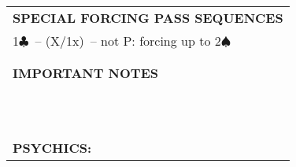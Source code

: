 \documentclass{article}
\newcommand\C{\ensuremath{\clubsuit}}
\renewcommand\S{\ensuremath{\spadesuit}}
\begin{document}
\begin{minipage}{90mm}
\begin{tabular}{| p{88mm} |}
		\\ \hline
		\\ \hline
		\textbf{SPECIAL FORCING PASS SEQUENCES} \\ \hline
		1\C\ -- (X/1x)\ -- not P: forcing up to 2\S\\ \hline
		\\ \hline
		\\ \hline
		\textbf{IMPORTANT NOTES} \\ \hline
		\\ \hline
		\\ \hline
		\\ \hline
		\\ \hline
		\\ \hline
		\\ \hline
		\\ \hline
		\\ \hline
		\\ \hline
		\\ \hline
		\\ \hline
		\textbf{PSYCHICS:} \\ \hline
	\end{tabular}
\end{minipage}
\end{document}
